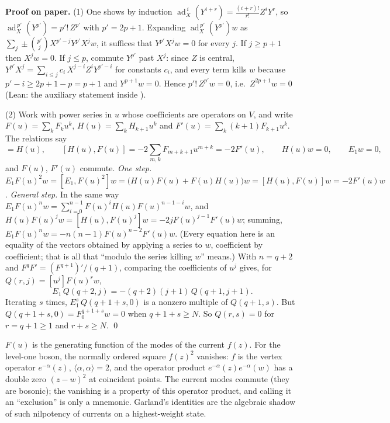 \textbf{Proof on paper.} (1) One shows by induction $\operatorname{ad}_X^{\,i}(Y^{i+r})=\frac{(i+r)!}{r!}Z^iY^r$, so
$\operatorname{ad}_X^{\,p'}(Y^{p'})=p'!\,Z^{p'}$ with $p'=2p+1$. Expanding $\operatorname{ad}_X^{\,p'}(Y^{p'})w$ as
$\sum_j\pm\binom{p'}jX^{p'-j}Y^{p'}X^jw$, it suffices that $Y^{p'}X^jw=0$ for every $j$. If $j\ge p+1$ then $X^jw=0$. If
$j\le p$, commute $Y^{p'}$ past $X^j$: since $Z$ is central, $Y^{p'}X^j=\sum_{i\le j}c_i\,X^{j-i}Z^iY^{p'-i}$ for constants
$c_i$, and every term kills $w$ because $p'-i\ge 2p+1-p=p+1$ and $Y^{p+1}w=0$. Hence $p'!\,Z^{p'}w=0$, i.e.\
$Z^{2p+1}w=0$ (Lean: the auxiliary statement  inside ).

(2) Work with power series in $u$ whose coefficients are operators on $V$, and write $F(u)=\sum_kF_ku^k$,
$H(u)=\sum_kH_{k+1}u^k$ and $F'(u)=\sum_k(k+1)F_{k+1}u^k$. The relations say
\begin{equation*}
[E_1,F(u)]=H(u),\qquad [H(u),F(u)]=-2\sum_{m,k}F_{m+k+1}u^{m+k}=-2F'(u),\qquad H(u)w=0,\qquad E_1w=0,
\end{equation*}
and $F(u)$, $F'(u)$ commute. \emph{One step.} $E_1F(u)^2w=[E_1,F(u)^2]w=\bigl(H(u)F(u)+F(u)H(u)\bigr)w=[H(u),F(u)]w=-2F'(u)w$.
\emph{General step.} In the same way $E_1F(u)^nw=\sum_{i=0}^{n-1}F(u)^iH(u)F(u)^{n-1-i}w$, and $H(u)F(u)^jw=[H(u),F(u)^j]w=-2jF(u)^{j-1}F'(u)w$;
summing, $E_1F(u)^nw=-n(n-1)F(u)^{n-2}F'(u)w$. (Every equation here is an equality of the vectors obtained by applying a series to
$w$, coefficient by coefficient; that is all that ``modulo the series killing $w$'' means.) With $n=q+2$ and
$F^qF'=(F^{q+1})'/(q+1)$, comparing the coefficients of $u^j$ gives, for $Q(r,j)=[u^j]F(u)^rw$,
\begin{equation*}
E_1\,Q(q+2,j)=-(q+2)(j+1)\,Q(q+1,j+1).
\end{equation*}
Iterating $s$ times, $E_1^s\,Q(q+1+s,0)$ is a nonzero multiple of $Q(q+1,s)$. But $Q(q+1+s,0)=F_0^{q+1+s}w=0$ when $q+1+s\ge N$.
So $Q(r,s)=0$ for $r=q+1\ge1$ and $r+s\ge N$. \qed

\begin{physics}
$F(u)$ is the generating function of the modes of the current $f(z)$. For the level-one boson, the normally ordered square
$f(z)^2$ vanishes: $f$ is the vertex operator $e^{-\alpha}(z)$, $\langle\alpha,\alpha\rangle=2$, and the operator product
$e^{-\alpha}(z)e^{-\alpha}(w)$ has a double zero $(z-w)^2$ at coincident points. The current modes commute (they are bosonic); the
vanishing is a property of this operator product, and calling it an ``exclusion'' is only a mnemonic. Garland's identities are the
algebraic shadow of such nilpotency of currents on a highest-weight state.
\end{physics}

